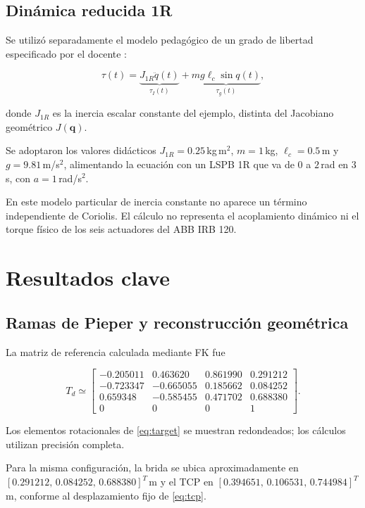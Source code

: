 \documentclass[conference]{IEEEtran}
\begin{document}
\subsection{Dinámica reducida 1R}

Se utilizó separadamente el modelo pedagógico de un grado de libertad especificado por el docente \cite{guiaH2,practicaS10}:

\begin{equation}
\tau(t)
=\underbrace{J_{1R}\ddot q(t)}_{\tau_I(t)}
+\underbrace{mg\ell_c\sin q(t)}_{\tau_g(t)},
\label{eq:tau}
\end{equation}

donde $J_{1R}$ es la inercia escalar constante del ejemplo, distinta del Jacobiano geométrico $J(\bm q)$.

Se adoptaron los valores didácticos $J_{1R}=0.25$\,kg\,m$^2$, $m=1$\,kg, $\ell_c=0.5$\,m y $g=9.81$\,m/s$^2$, alimentando la ecuación con un LSPB 1R que va de $0$ a $2$\,rad en $3$\,s, con $a=1$\,rad/s$^2$.

En este modelo particular de inercia constante no aparece un término independiente de Coriolis. El cálculo no representa el acoplamiento dinámico ni el torque físico de los seis actuadores del ABB IRB 120.

\section{Resultados clave}

\subsection{Ramas de Pieper y reconstrucción geométrica}

La matriz de referencia calculada mediante FK fue

\begin{equation}
T_d\simeq
\begin{bmatrix}
-0.205011 & 0.463620 & 0.861990 & 0.291212\\
-0.723347 &-0.665055 & 0.185662 & 0.084252\\
 0.659348 &-0.585455 & 0.471702 & 0.688380\\
 0 &0&0&1
\end{bmatrix}.
\label{eq:target}
\end{equation}

Los elementos rotacionales de \eqref{eq:target} se muestran redondeados; los cálculos utilizan precisión completa.

Para la misma configuración, la brida se ubica aproximadamente en $[0.291212,\,0.084252,\,0.688380]^T$\,m y el TCP en $[0.394651,\,0.106531,\,0.744984]^T$\,m, conforme al desplazamiento fijo de \eqref{eq:tcp}.
\end{document}
